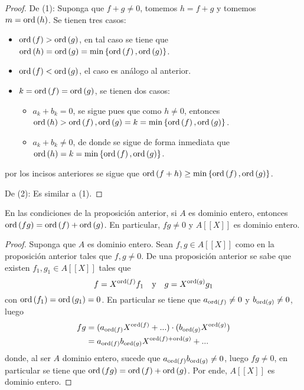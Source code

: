 \documentclass[12pt]{report}
\theoremstyle{largebreak}
\newcommand{\ord}[1]{\ensuremath{\textup{ord}\left(#1\right)}}
\begin{document}
    \begin{proof}
        De (1): Suponga que $f+g\neq0$, tomemos $h=f+g$ y tomemos $m=\ord{h}$. Se tienen tres casos:
        \begin{itemize}
            \item $\ord{f}>\ord{g}$, en tal caso se tiene que $\ord{h}=\ord{g}=\min\left\{\ord{f},\ord{g}\right\}$.
            \item $\ord{f}<\ord{g}$, el caso es análogo al anterior.
            \item $k=\ord{f}=\ord{g}$, se tienen dos casos:
            \begin{itemize}
                \item $a_{k}+b_k=0$, se sigue pues que como $h\neq0$, entonces $\ord{h}>\ord{f},\ord{g}=k=\min\left\{\ord{f},\ord{g}\right\}$.
                \item $a_{k}+b_k\neq0$, de donde se sigue de forma inmediata que $\ord{h}=k=\min\left\{\ord{f},\ord{g}\right\}$.
            \end{itemize}
        \end{itemize}
        por los incisos anteriores se sigue que $\ord{f+h}\geq\min\left\{\ord{f},\ord{g}\right\}$.

        De (2): Es similar a (1).
    \end{proof}

    \begin{cor}
        En las condiciones de la proposición anterior, si $A$ es dominio entero, entonces $\ord{fg}=\ord{f}+\ord{g}$. En particular, $fg\neq0$ y $A[[X]]$ es dominio entero.
    \end{cor}

    \begin{proof}
        Suponga que $A$ es dominio entero. Sean $f,g\in A[[X]]$ como en la proposición anterior tales que $f,g\neq0$. De una proposición anterior se sabe que existen $f_1,g_1\in A[[X]]$ tales que
        \begin{equation*}
            f=X^{\ord{f}}f_1\quad\textup{y}\quad g=X^{\ord{g}}g_1
        \end{equation*}
        con $\ord{f_1}=\ord{g_1}=0$. En particular se tiene que $a_{\ord{f}}\neq0$ y $b_{\ord{g}}\neq0$, luego
        \begin{equation*}
            \begin{split}
                fg&=(a_{\ord{f}}X^{\ord{f}}+...)\cdot(b_{\ord{g}}X^{\ord{g}})\\
                &=a_{\ord{f}}b_{\ord{g}}X^{\ord{f}+\ord{g}}+...\\
            \end{split}
        \end{equation*}
        donde, al ser $A$ dominio entero, sucede que $a_{\ord{f}}b_{\ord{g}}\neq0$, luego $fg\neq0$, en particular se tiene que $\ord{fg}=\ord{f}+\ord{g}$. Por ende, $A[[X]]$ es dominio entero.
    \end{proof}
\end{document}
